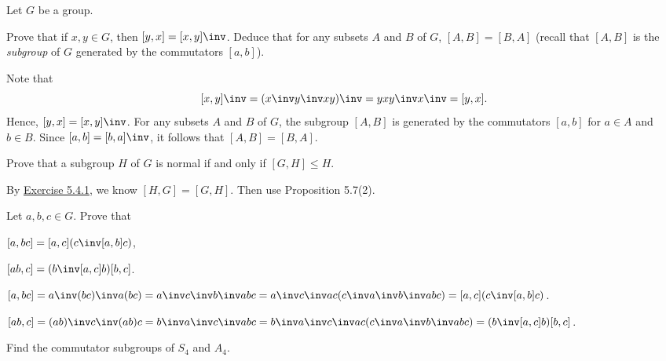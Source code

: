 Let $G$ be a group.

\begin{exercise}\label{ex5.4.1}
    Prove that if $x, y \in G$, then $[y, x] = [x, y]\inv$. Deduce that for any subsets $A$ and $B$ of $G$, $[A, B] = [B, A]$ (recall that $[A, B]$ is the \emph{subgroup} of $G$ generated by the commutators $[a, b]$).
\end{exercise}

\begin{sol}
    Note that
    \[[x, y]\inv = (x\inv y\inv xy)\inv = yx y\inv x\inv = [y, x].\]
    Hence, $[y, x] = [x, y]\inv$. For any subsets $A$ and $B$ of $G$, the subgroup $[A, B]$ is generated by the commutators $[a, b]$ for $a \in A$ and $b \in B$. Since $[a, b] = [b, a]\inv$, it follows that $[A, B] = [B, A]$.
\end{sol}

\begin{exercise}\label{ex5.4.2}
    Prove that a subgroup $H$ of $G$ is normal if and only if $[G, H] \leq H$.
\end{exercise}

\begin{sol}
    By \hyperref[ex5.4.1]{Exercise 5.4.1}, we know $[H, G] = [G, H]$. Then use Proposition 5.7(2).
\end{sol}

\begin{exercise}\label{ex5.4.3}
    Let $a, b, c \in G$. Prove that
    \begin{subproblems}
        \item $[a, bc] = [a, c](c\inv [a, b]c)$,
        \item $[ab, c] = (b\inv[a, c]b)[b, c]$.
    \end{subproblems}
\end{exercise}

\begin{solalph}
    \item $[a, bc] = a\inv (bc)\inv a(bc) = a\inv c\inv b\inv a b c = a\inv c\inv a c (c\inv a\inv b\inv a b c) = [a, c](c\inv [a, b]c)$.
    \item $[ab, c] = (ab)\inv c\inv (ab)c = b\inv a\inv c\inv a b c = b\inv a\inv c\inv a c (c\inv a\inv b\inv a b c) = (b\inv[a, c]b)[b, c]$. \qh
\end{solalph}

\begin{exercise}\label{ex5.4.4}
    Find the commutator subgroups of $S_4$ and $A_4$.
\end{exercise}

